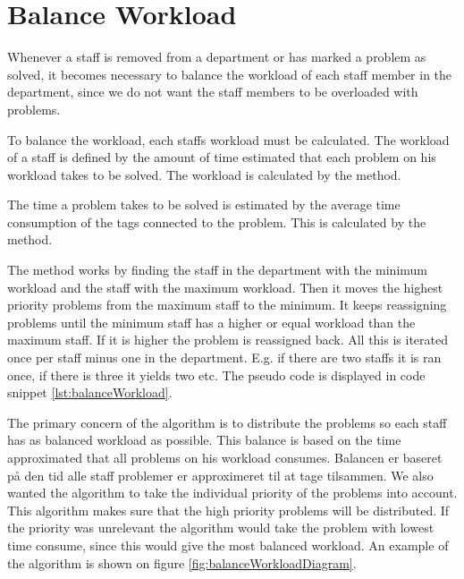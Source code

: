 \section{Balance Workload}
Whenever a staff is removed from a department or has marked a problem as solved, 
it becomes necessary to balance the workload of each staff member in the department, since we do not want the staff members to be overloaded with problems. 

To balance the workload, each staffs workload must be calculated. 
The workload of a staff is defined by the amount of time estimated that each problem on his workload takes to be solved. 
The workload is calculated by the  method.

The time a problem takes to be solved is estimated by the average time consumption of the tags connected to the problem. 
This is calculated by the  method.

The  method works by finding the staff in the department with the minimum workload and the staff with the maximum workload. Then it moves the highest priority problems from the maximum staff to the minimum. 
It keeps reassigning problems until the minimum staff has a higher or equal workload than the maximum staff. If it is higher the problem is reassigned back. 
All this is iterated once per staff minus one in the department. 
E.g. if there are two staffs it is ran once, if there is three it yields two etc. 
The pseudo code is displayed in code snippet \ref{lst:balanceWorkload}.

The primary concern of the algorithm is to distribute the problems so each staff has as balanced workload as possible. 
This balance is based on the time approximated that all problems on his workload consumes. 
Balancen er baseret p\aa{} den tid alle staff problemer er approximeret til at tage tilsammen. 
We also wanted the algorithm to take the individual priority of the problems into account. 
This algorithm makes sure that the high priority problems will be distributed. 
If the priority was unrelevant the algorithm would take the problem with lowest time consume, since this would give the most balanced workload. 
An example of the algorithm is shown on figure \ref{fig:balanceWorkloadDiagram}. 



